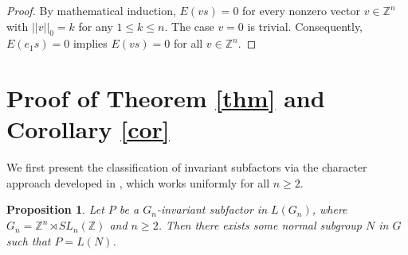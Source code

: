 \documentclass[12pt]{amsart}
\newtheorem{prop}[theorem]{Proposition}
\theoremstyle{definition}
\theoremstyle{remark}
\begin{document}
\begin{proof}
By mathematical induction, $E(vs) = 0 $ for every nonzero vector $v\in\mathbb{Z}^n$ with $||v||_{0} = k$ for any $1\le k \le n$. The case $v=0$ is trivial.
Consequently, $E(e_1s) = 0$ implies $E(vs)=0$ for all $v\in\mathbb{Z}^n$.
\end{proof}

\section{Proof of Theorem \ref{thm} and Corollary \ref{cor}}\label{section: proof}

We first present the classification of invariant subfactors via the character approach developed in \cite{dj,jz}, which works uniformly for all $n\geq 2$.
\begin{prop}\label{prop: classify_invariant_subfactors}
    Let $P$ be a $G_n$-invariant subfactor in $L(G_n)$, where $G_n=\mathbb{Z}^n\rtimes SL_n(\mathbb{Z})$ and $n\geq 2$. Then there exists some normal subgroup $N$ in $G$ such that $P=L(N)$.
\end{prop}
\end{document}

